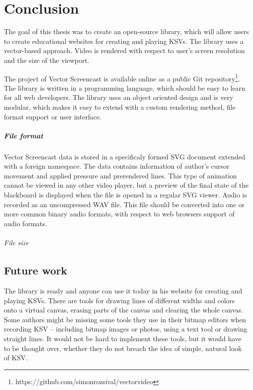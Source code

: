 \chapter*{Conclusion}

The goal of this thesis was to create an open-source library, which will allow users to create educational websites for creating and playing KSVs. The library uses a vector-based approach. Video is rendered with respect to user's screen resolution and the size of the viewport.

The project of Vector Screencast is available online as a public Git repository\footnote{https://github.com/simonrozsival/vectorvideo}. The library is written in a programming language, which should be easy to learn for all web developers. The library uses an object oriented design and is very modular, which makes it easy to extend with a custom rendering method, file format support or user interface.

\paragraph{File format} Vector Screencast data is stored in a specificaly formed SVG document extended with a foreign namespace. The data contains information of author's cursor movement and applied pressure and prerendered lines. This type of animation cannot be viewed in any other video player, but a preview of the final state of the blackboard is displayed when the file is opened in a regular SVG viewer. Audio is recorded as an uncompressed WAV file. This file should be converted into one or more common binary audio formats, with respect to web browsers support of audio formats. 

\subparagraph{File size}

\section{Future work}
The library is ready and anyone can use it today in his website for creating and playing KSVs. There are tools for drawing lines of different widths and colors onto a virtual canvas, erasing parts of the canvas and clearing the whole canvas. Some authors might be missing some tools they use in their bitmap editors when recording KSV -- including bitmap images or photos, using a text tool or drawing straight lines. It would not be hard to implement these tools, but it would have to be thought over, whether they do not breach the idea of simple, natural look of KSV.

